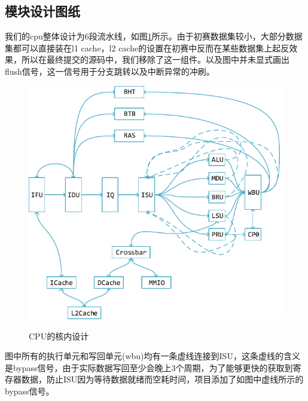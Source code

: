 \documentclass[lang=cn,11pt,a4paper]{elegantpaper}
\begin{document}
\subsection{模块设计图纸}

我们的cpu整体设计为6段流水线，如图\ref{fig:design_of_core}所示。由于初赛数据集较小，大部分数据集都可以直接装在l1 cache，l2 cache的设置在初赛中反而在某些数据集上起反效果，所以在最终提交的源码中，我们移除了这一组件。以及图中并未显式画出flush信号，这一信号用于分支跳转以及中断异常的冲刷。

\begin{figure}[htbp]
	\centering
	\includegraphics[]{image/core}\\
	\caption{CPU的核内设计}\label{fig:design_of_core}
\end{figure}

图中所有的执行单元和写回单元(wbu)均有一条虚线连接到ISU，这条虚线的含义是bypass信号，由于实际数据写回至少会晚上3个周期，为了能够更快的获取到寄存器数据，防止ISU因为等待数据就绪而空耗时间，项目添加了如图中虚线所示的bypass信号。
\end{document}
